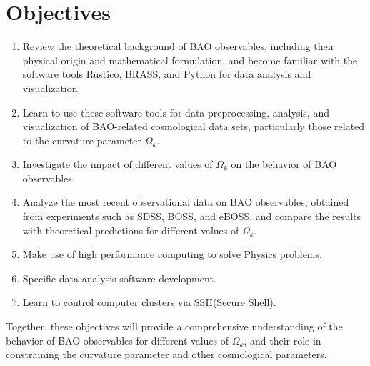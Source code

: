 \chapter{Objectives}
\label{cha:objectives}

\begin{enumerate}
  \item Review the theoretical background of BAO observables, including their physical origin and mathematical formulation, and become familiar with the software tools Rustico, BRASS, and Python for data analysis and visualization.
  \item Learn to use these software tools for data preprocessing, analysis, and visualization of BAO-related cosmological data sets, particularly those related to the curvature parameter $\Omega_k$.
  \item Investigate the impact of different values of $\Omega_k$ on the behavior of BAO observables.
  \item Analyze the most recent observational data on BAO observables, obtained from experiments such as SDSS, BOSS, and eBOSS, and compare the results with theoretical predictions for different values of $\Omega_k$.
	\item Make use of high performance computing to solve Physics problems.
  \item Specific data analysis software development.
  \item Learn to control computer clusters via SSH(Secure Shell).
\end{enumerate}
Together, these objectives will provide a comprehensive understanding of the behavior of BAO observables for different values of $\Omega_k$, and their role in constraining the curvature parameter and other cosmological parameters.




